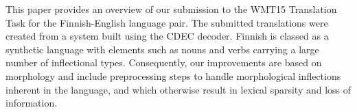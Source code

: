 This paper provides an overview of our submission to the WMT15 Translation Task for the Finnish-English language pair. The submitted translations were created from a system built using the CDEC decoder. Finnish is classed as a synthetic language with elements such as nouns and verbs carrying a large number of inflectional types. Consequently, our improvements are based on morphology and include preprocessing steps to handle morphological inflections inherent in the language, and which otherwise result in lexical sparsity and loss of information.
